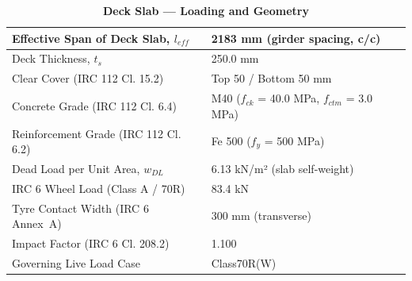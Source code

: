 \documentclass[12pt,a4paper]{report}
\numberwithin{table}{chapter}
\numberwithin{figure}{chapter}
\begin{document}
\vspace{1em}
\begin{longtable}{|L{5.5cm}|p{10.0cm}|}
\caption{\textbf{Deck Slab --- Loading and Geometry}}
\hline
\textnormal{Effective Span of Deck Slab, $l_{eff}$} & 2183 mm (girder spacing, c/c) \\[6pt]
\hline
\textnormal{Deck Thickness, $t_s$} & 250.0 mm \\[6pt]
\hline
\textnormal{Clear Cover (IRC 112 Cl. 15.2)} & Top 50 / Bottom 50 mm \\[6pt]
\hline
\textnormal{Concrete Grade (IRC 112 Cl. 6.4)} & M40 ($f_{ck}$ = 40.0 MPa, $f_{ctm}$ = 3.0 MPa) \\[6pt]
\hline
\textnormal{Reinforcement Grade (IRC 112 Cl. 6.2)} & Fe 500 ($f_y$ = 500 MPa) \\[6pt]
\hline
\textnormal{Dead Load per Unit Area, $w_{DL}$} & 6.13 kN/m² (slab self-weight) \\[6pt]
\hline
\textnormal{IRC 6 Wheel Load (Class A / 70R)} & 83.4 kN \\[6pt]
\hline
\textnormal{Tyre Contact Width (IRC 6 Annex~A)} & 300 mm (transverse) \\[6pt]
\hline
\textnormal{Impact Factor (IRC 6 Cl. 208.2)} & 1.100 \\[6pt]
\hline
\textnormal{Governing Live Load Case} & Class70R(W) \\[6pt]
\hline
\end{longtable}
\end{document}

